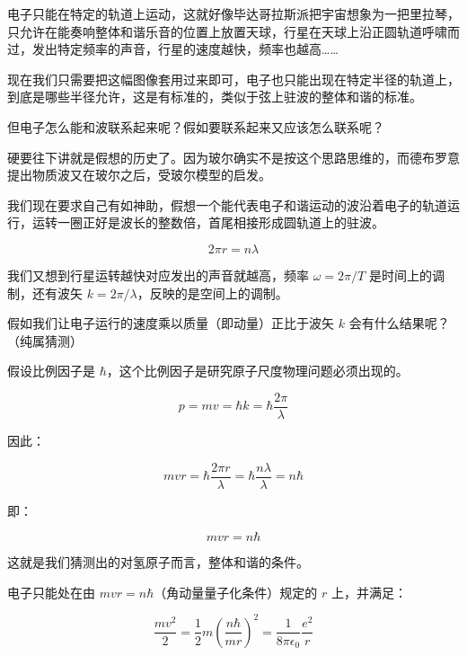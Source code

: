 电子只能在特定的轨道上运动，这就好像毕达哥拉斯派把宇宙想象为一把里拉琴，只允许在能奏响整体和谐乐音的位置上放置天球，行星在天球上沿正圆轨道呼啸而过，发出特定频率的声音，行星的速度越快，频率也越高……

现在我们只需要把这幅图像套用过来即可，电子也只能出现在特定半径的轨道上，到底是哪些半径允许，这是有标准的，类似于弦上驻波的整体和谐的标准。


但电子怎么能和波联系起来呢？假如要联系起来又应该怎么联系呢？

硬要往下讲就是假想的历史了。因为玻尔确实不是按这个思路思维的，而德布罗意提出物质波又在玻尔之后，受玻尔模型的启发。

我们现在要求自己有如神助，假想一个能代表电子和谐运动的波沿着电子的轨道运行，运转一圈正好是波长的整数倍，首尾相接形成圆轨道上的驻波。

\begin{equation}
2 \pi r = n \lambda
\end{equation}

我们又想到行星运转越快对应发出的声音就越高，频率 $\omega = 2 \pi /T$ 是时间上的调制，还有波矢 $k = 2 \pi / \lambda$，反映的是空间上的调制。

假如我们让电子运行的速度乘以质量（即动量）正比于波矢 $k$ 会有什么结果呢？（纯属猜测）

假设比例因子是 $\hbar$，这个比例因子是研究原子尺度物理问题必须出现的。

\begin{equation}
p = m v = \hbar k = \hbar \frac{2 \pi }{\lambda}
\end{equation}

因此：

\begin{equation}
m v r = \hbar \frac{2 \pi r}{\lambda} = \hbar \frac{ n \lambda }{ \lambda} = n \hbar
\end{equation}

即：

\begin{equation}
mvr = n \hbar 
\end{equation}

这就是我们猜测出的对氢原子而言，整体和谐的条件。

电子只能处在由 $mvr=n \hbar$（角动量量子化条件）规定的 $r$ 上，并满足：

\begin{equation}
\frac{m v^2}{2} = \frac{1}{2} m \left(  \frac{ n \hbar  }{ m r }  \right)^2 = \frac{1}{8 \pi \epsilon_0 } \frac{e^2 }{r }  
\end{equation}

